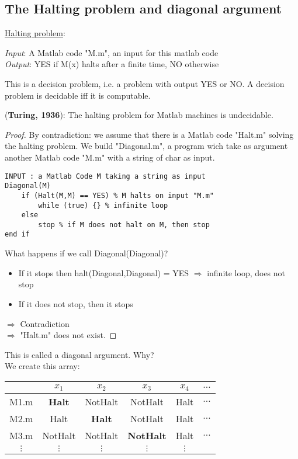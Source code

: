 \subsection{The Halting problem and diagonal argument}
\underline{Halting problem}:\\
\begin{leftbar}
\textit{Input}: A Matlab code "M.m", an input for this matlab code\\
\textit{Output}: YES if M(x) halts after a finite time, NO otherwise
\end{leftbar}

This is a decision problem, i.e. a problem with output YES or NO. A decision problem is decidable iff it is computable.\\

\begin{theorem}(\textbf{Turing, 1936}): The halting problem for Matlab machines is undecidable.
\end{theorem}
\begin{proof} By contradiction: we assume that there is a Matlab code "Halt.m" solving the halting problem. We build "Diagonal.m", a program wich take as argument another Matlab code "M.m" with a string of char as input.

\begin{lstlisting}[label={list:c3:select},caption={Diagonal(M)}]
INPUT : a Matlab Code M taking a string as input
Diagonal(M)
    if (Halt(M,M) == YES) % M halts on input "M.m"
        while (true) {} % infinite loop
    else
        stop % if M does not halt on M, then stop
end if
\end{lstlisting}

What happens if we call Diagonal(Diagonal)?
\begin{itemize}
\item If it stops then halt(Diagonal,Diagonal) = YES $\Rightarrow$ infinite loop, does not stop
\item If it does not stop, then it stops
\end{itemize}
$\Rightarrow$ Contradiction\\
$\Rightarrow$ "Halt.m" does not exist.
\end{proof}

This is called a diagonal argument. Why?\\
We create this array:
\begin{tabular}{c|ccccc}
	& $x_1$ & $x_2$ & $x_3$ & $x_4$ & $\hdots$ \\
  \hline
 	M1.m & \textbf{Halt} & NotHalt & NotHalt & Halt & $\hdots$  \\
 	M2.m & Halt & \textbf{Halt} & NotHalt & Halt & $\hdots$  \\
 	M3.m & NotHalt & NotHalt & \textbf{NotHalt} & Halt & $\hdots$  \\
 	$\vdots$ & $\vdots$ & $\vdots$ & $\vdots$ & $\vdots$ &  \\
\end{tabular}

